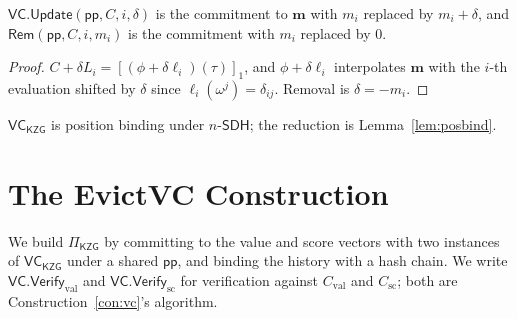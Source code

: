 \documentclass[version=preprint]{iacrcc}
\theoremstyle{definition}
\newcommand{\Vfy}{\mathsf{Verify}}
\newcommand{\Update}{\mathsf{Update}}
\newcommand{\Rem}{\mathsf{Rem}}
\newcommand{\pp}{\mathsf{pp}}
\newcommand{\Val}{\mathrm{val}}
\newcommand{\Sc}{\mathrm{sc}}
\newcommand{\Cval}{C_{\Val}}
\newcommand{\Csc}{C_{\Sc}}
\newcommand{\VC}{\mathsf{VC}}
\newcommand{\gone}[1]{\left[#1\right]_{1}}
\newcommand{\lag}{\ell}
\newcommand{\nsdh}{n\text{-}\mathsf{SDH}}
\begin{document}
\begin{lemma}\label{lem:update}
$\VC.\Update(\pp,C,i,\delta)$ is the commitment to $\mathbf{m}$ with $m_i$
replaced by $m_i+\delta$, and $\Rem(\pp,C,i,m_i)$ is the commitment with $m_i$
replaced by $0$.
\end{lemma}
\begin{proof}
$C+\delta L_i=\gone{(\phi+\delta\lag_i)(\tau)}$, and $\phi+\delta\lag_i$
interpolates $\mathbf{m}$ with the $i$-th evaluation shifted by $\delta$ since
$\lag_i(\omega^{j})=\delta_{ij}$. Removal is $\delta=-m_i$.
\end{proof}

\begin{remark}\label{rem:vcbind}
$\VC_{\mathsf{KZG}}$ is position binding under $\nsdh$; the reduction is
Lemma~\ref{lem:posbind}.
\end{remark}

\section{The EvictVC Construction}\label{sec:construction}

We build $\Pi_{\mathsf{KZG}}$ by committing to the value and score vectors with
two instances of $\VC_{\mathsf{KZG}}$ under a shared $\pp$, and binding the
history with a hash chain. We write $\VC.\Vfy_{\Val}$ and $\VC.\Vfy_{\Sc}$ for
verification against $\Cval$ and $\Csc$; both are
Construction~\ref{con:vc}'s algorithm.
\end{document}
